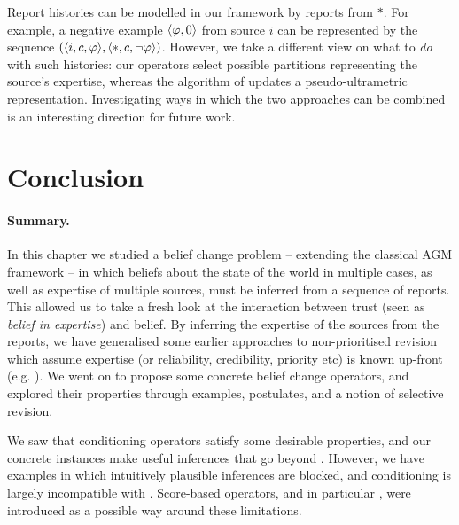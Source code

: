 Report histories can be modelled in our framework by reports from $\ast$. For
example, a negative example $\langle {\varphi, 0} \rangle$ from source $i$ can be
represented by the sequence $(\langle {i, c, \varphi} \rangle, \langle {\ast, c, \neg\varphi} \rangle)$.
However, we take a different view on what to \emph{do} with such histories: our
operators select possible partitions representing the source's expertise,
whereas the algorithm of \textcite{hunter_building_21} updates a
pseudo-ultrametric representation. Investigating ways in which the two
approaches can be combined is an interesting direction for future work.

\section{Conclusion}
\label{kr_sec_conclusion}

\paragraph{Summary.} In this chapter we studied a belief change problem --
extending the classical AGM framework -- in which
beliefs about the state of the world in multiple cases, as well as expertise of
multiple sources, must be inferred from a sequence of reports. This allowed us
to take a fresh look at the
interaction between trust (seen as \emph{belief in expertise}) and belief.
By inferring the expertise of the sources from the reports,
we have generalised some earlier approaches to non-prioritised
revision which assume expertise (or reliability, credibility, priority
etc) is known up-front (e.g.
\cite{ferme1999selective,hansson_2001,booth_trust_2018,delgrande2006iterated}).
We went on to propose some concrete belief change operators, and explored their
properties through examples, postulates, and a notion of selective revision.

We saw that conditioning operators satisfy some desirable
properties, and our concrete instances make useful inferences that go
beyond \weakop{}. However, we have examples in which intuitively plausible
inferences are blocked, and conditioning is largely incompatible with
\strongcondsucc{}. Score-based operators, and in particular \scorebasedop{},
were introduced as a possible way around these limitations. 

